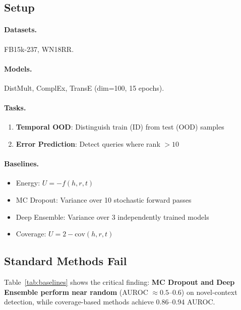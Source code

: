 \documentclass{article}
\begin{document}
\subsection{Setup}

\paragraph{Datasets.} FB15k-237, WN18RR.

\paragraph{Models.} DistMult, ComplEx, TransE (dim=100, 15 epochs).

\paragraph{Tasks.}
\begin{enumerate}
    \item \textbf{Temporal OOD}: Distinguish train (ID) from test (OOD) samples
    \item \textbf{Error Prediction}: Detect queries where rank $> 10$
\end{enumerate}

\paragraph{Baselines.}
\begin{itemize}
    \item Energy: $U = -f(h,r,t)$
    \item MC Dropout: Variance over 10 stochastic forward passes
    \item Deep Ensemble: Variance over 3 independently trained models
    \item Coverage: $U = 2 - \text{cov}(h,r,t)$
\end{itemize}

\subsection{Standard Methods Fail}

Table~\ref{tab:baselines} shows the critical finding: \textbf{MC Dropout and Deep Ensemble perform near random} (AUROC $\approx 0.5$--$0.6$) on novel-context detection, while coverage-based methods achieve 0.86--0.94 AUROC.
\end{document}
